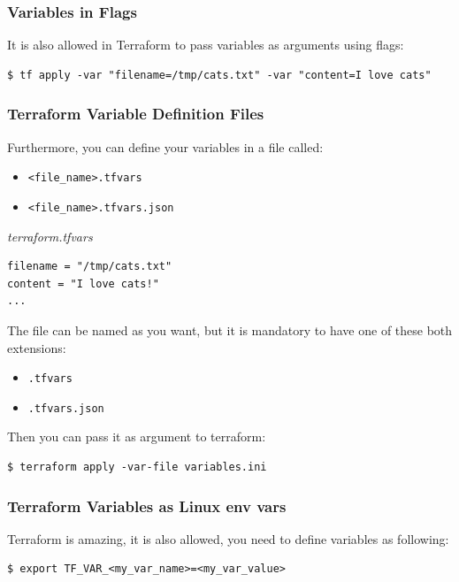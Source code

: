 \documentclass{article}
\newenvironment{blocktemplateIII}[1]{%
    \tcolorbox[beamer,%
    noparskip,breakable,
    ,colframe=Red,%
    colbacklower=LimeGreen!75!LightGreen,%
    title=#1]}%
    {\endtcolorbox}
\newenvironment{codetemplate}[1][]{%
  \mybasecolorbox[#1]
  \itshape
}{%
  \endmybasecolorbox
}
\begin{document}
\subsubsection{Variables in Flags}
It is also allowed in Terraform to pass variables as arguments using flags:
\begin{codetemplate}{}
\begin{verbatim}
$ tf apply -var "filename=/tmp/cats.txt" -var "content=I love cats"
\end{verbatim}
\end{codetemplate}

\subsubsection{Terraform Variable Definition Files}
Furthermore, you can define your variables in a file called:
\begin{itemize}
    \item \verb+<file_name>.tfvars+
    \item \verb+<file_name>.tfvars.json+
\end{itemize}

\begin{codetemplate}{terraform.tfvars}
\begin{verbatim}
filename = "/tmp/cats.txt"
content = "I love cats!"
...
\end{verbatim}
\end{codetemplate}

\begin{blocktemplateIII}{WARNING}
The file can be named as you want, but it is mandatory to have one of these both extensions:
\begin{itemize}
    \item \verb+.tfvars+
    \item \verb+.tfvars.json+
\end{itemize}

Then you can pass it as argument to terraform:
\begin{codetemplate}{}
\begin{verbatim}
$ terraform apply -var-file variables.ini
\end{verbatim}
\end{codetemplate}
\end{blocktemplateIII}

\subsubsection{Terraform Variables as Linux env vars}
Terraform is amazing, it is also allowed, you need to define variables as following:
\begin{codetemplate}{}
\begin{verbatim}
$ export TF_VAR_<my_var_name>=<my_var_value>
\end{verbatim}
\end{codetemplate}
\end{document}
